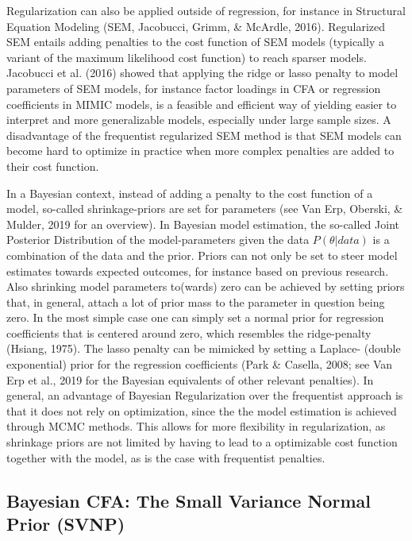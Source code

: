 \documentclass[
  man, donotrepeattitle,floatsintext]{apa6}
\begin{document}
Regularization can also be applied outside of regression, for instance in Structural Equation Modeling (SEM, Jacobucci, Grimm, \& McArdle, 2016). Regularized SEM entails adding penalties to the cost function of SEM models (typically a variant of the maximum likelihood cost function) to reach sparser models. Jacobucci et al. (2016) showed that applying the ridge or lasso penalty to model parameters of SEM models, for instance factor loadings in CFA or regression coefficients in MIMIC models, is a feasible and efficient way of yielding easier to interpret and more generalizable models, especially under large sample sizes. A disadvantage of the frequentist regularized SEM method is that SEM models can become hard to optimize in practice when more complex penalties are added to their cost function.

In a Bayesian context, instead of adding a penalty to the cost function of a model, so-called shrinkage-priors are set for parameters (see Van Erp, Oberski, \& Mulder, 2019 for an overview). In Bayesian model estimation, the so-called Joint Posterior Distribution of the model-parameters given the data \(P({\theta} | data)\) is a combination of the data and the prior. Priors can not only be set to steer model estimates towards expected outcomes, for instance based on previous research. Also shrinking model parameters to(wards) zero can be achieved by setting priors that, in general, attach a lot of prior mass to the parameter in question being zero. In the most simple case one can simply set a normal prior for regression coefficients that is centered around zero, which resembles the ridge-penalty (Hsiang, 1975). The lasso penalty can be mimicked by setting a Laplace- (double exponential) prior for the regression coefficients (Park \& Casella, 2008; see Van Erp et al., 2019 for the Bayesian equivalents of other relevant penalties). In general, an advantage of Bayesian Regularization over the frequentist approach is that it does not rely on optimization, since the the model estimation is achieved through MCMC methods. This allows for more flexibility in regularization, as shrinkage priors are not limited by having to lead to a optimizable cost function together with the model, as is the case with frequentist penalties.

\hypertarget{bayesian-cfa-the-small-variance-normal-prior-svnp}{%
\subsection{Bayesian CFA: The Small Variance Normal Prior (SVNP)}\label{bayesian-cfa-the-small-variance-normal-prior-svnp}}
\end{document}

